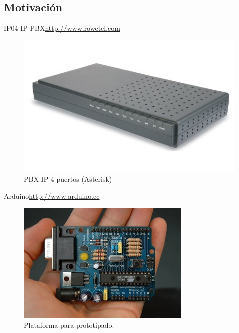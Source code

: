 \documentclass{beamer}
\begin{document}
\subsection{Motivación}

\begin{frame}{IP04 IP-PBX}{\url{http://www.rowetel.com}}
  \begin{figure}
    \centering
    \includegraphics{img/ip04}
    \caption{PBX IP 4 puertos (Asterisk)}
    \label{fig:asterisk}
  \end{figure}
\end{frame}

\begin{frame}{Arduino}{\url{http://www.arduino.cc}}
  \begin{figure}
    \includegraphics[scale=0.6]{img/arduino316}
    \caption{Plataforma para prototipado.}
    \label{fig:arduino}
  \end{figure}
\end{frame}
\end{document}

